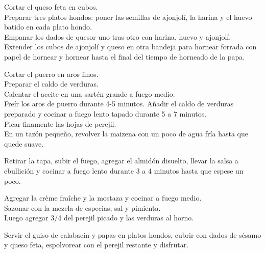 \begin{recipe}
{        \step Cortar el queso feta en cubos.\\
        Preparar tres platos hondos: poner las semillas de ajonjol\'i, la harina y el huevo batido en cada plato hondo.\\
        Empanar los dados de quesor uno tras otro con harina, huevo y ajonjol\'i.\\
        Extender los cubos de ajonjol\'i y queso en otra bandeja para hornear forrada con papel de hornear y hornear hasta el final del tiempo de horneado de la papa.

        \step Cortar el puerro en aros finos.\\
        Preparar el caldo de verduras.\\
        Calentar el aceite en una sart\'en grande a fuego medio.\\
        Fre\'ir los aros de puerro durante 4-5 minutos.
        A\~nadir el caldo de verduras preparado y cocinar a fuego lento tapado durante 5 a 7 minutos.\\
        Picar finamente las hojas de perejil.\\
        En un taz\'on peque\~no, revolver la maizena con un poco de agua fr\'ia hasta que quede suave.

        \step Retirar la tapa, subir el fuego, agregar el almid\'on disuelto, llevar la salsa a ebullici\'on y cocinar a fuego lento durante 3 a 4 minutos hasta que espese un poco.

        \step Agregar la cr\`eme fra\^iche y la mostaza y cocinar a fuego medio.\\
        Sazonar con la mezcla de especias, sal y pimienta.\\
        Luego agregar 3/4 del perejil picado y las verduras al horno.

        \step Servir el guiso de calabac\'in y papas en platos hondos, cubrir con dados de s\'esamo y queso feta, espolvorear con el perejil restante y disfrutar.
    }





\end{recipe}
